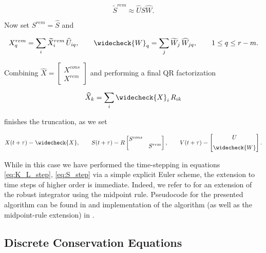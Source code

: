 \begin{equation}
    \widetilde{ S }^{rem} \approx \widehat{ U } \widehat{ S } \widehat{ W } . 
\end{equation}

Now set $S^{rem} = \widehat{ S }$ and 

\begin{equation}
    X^{rem}_q = \sum_i \widetilde{ X }^{rem}_i\, \widehat{ U }_{i q} , \quad\quad 
    \widecheck{ W }_q = \sum_j \widetilde{ W }_j\, \widehat{ W }_{j q} , 
    \quad\quad 1 \leq q \leq r - m . 
\end{equation}

Combining $\widehat{ X } = \begin{bmatrix} X^{cons} \\ X^{rem} \end{bmatrix}$ and 
performing a final QR factorization

\begin{equation}
    \widehat{ X }_k = \sum_i \widecheck{ X }_i\, R_{i k}
\end{equation}

finishes the truncation, as we set

\begin{equation}
    X (t + \tau) = \widecheck{ X }, \quad\quad 
    S (t + \tau) = R \begin{bmatrix}
        S^{cons} & \\
        & S^{rem}
    \end{bmatrix}, \quad\quad
    V (t + \tau) = \begin{bmatrix}
        U \\[0.5em] 
        \widecheck{ W }
    \end{bmatrix} . 
\end{equation}

While in this case we have performed the time-stepping in equations \ref{eq:K_L_step}, 
\ref{eq:S_step} via a simple explicit Euler scheme, the extension to time steps of higher 
order is immediate. Indeed, we refer to \cite{ceruti2024} for an extension of the robust 
integrator using the midpoint rule. Pseudocode for the presented algorithm can be found 
in \cite{robustlowrank} and implementation of the algorithm (as well as the midpoint-rule 
extension) in \cite{BUGimplementation}. 

\subsection{Discrete Conservation Equations}

